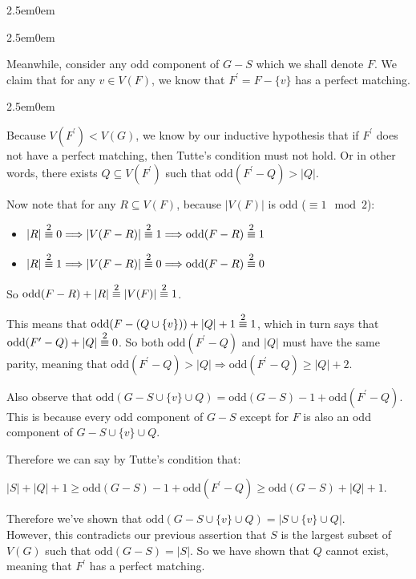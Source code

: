 \documentclass{book}
\newcommand{\hFour}{%
   \color{Cerulean}
   \fontsize{12}{14}\selectfont%
}
\newenvironment{myIndent}{%
   \begin{adjustwidth}{2.5em}{0em}%
}{%
   \end{adjustwidth}%
}
\newcommand{\oddComp}[1]{\mathrm{odd}(#1)}
\newcommand{\myequiv}[1]{\stackrel{\mathclap{\mbox{\footnotesize{$#1$}}}}{\equiv}}
\newcommand{\retTwo}{\hfill\bigbreak}
\begin{document}
{\begin{myIndent}
\begin{myIndent}
      Meanwhile, consider any odd component of $G - S$ which we shall denote $F$. We claim that for any $v \in V(F)$, we know that $F^\prime = F - \{v\}$ has a perfect matching.
      {\begin{myIndent} \hFour
         Because $V(F^\prime) < V(G)$, we know by our inductive hypothesis that if $F^\prime$ does not have a perfect matching, then Tutte's condition must not hold. Or in other words, there exists $Q \subseteq V(F^\prime)$ such that $\oddComp{F^\prime - Q} > |Q|$. \retTwo

         Now note that for any $R \subseteq V(F)$, because $|V(F)|$ is odd ($\equiv 1 \mod{2}$):
         \begin{itemize}
            \item $|R| \myequiv{2} 0 \Longrightarrow |V(F - R)| \myequiv{2} 1 \Longrightarrow \oddComp{F - R} \myequiv{2} 1$
            \item  $|R| \myequiv{2} 1 \Longrightarrow |V(F - R)| \myequiv{2} 0 \Longrightarrow \oddComp{F - R} \myequiv{2} 0$
         \end{itemize}
         So $\oddComp{F - R} + |R| \myequiv{2} |V(F)| \myequiv{2} 1$. \retTwo

         This means that $\oddComp{F - (Q \cup \{v\})} + |Q| + 1 \myequiv{2} 1$, which in turn says that $\oddComp{F^\prime - Q} + |Q| \myequiv{2} 0$. So both $\oddComp{F^\prime - Q}$ and $|Q|$ must have the same parity, meaning that  $\oddComp{F^\prime - Q} > |Q| \Rightarrow \oddComp{F^\prime - Q} \geq |Q| + 2$. \retTwo

         Also observe that $\oddComp{G - S \cup \{v\} \cup Q} = \oddComp{G - S} - 1 + \oddComp{F^\prime - Q}$. This is because every odd component of $G - S$ except for $F$ is also an odd component of $G - S \cup \{v\} \cup Q$. \retTwo

         Therefore we can say by Tutte's condition that:

         {\center$ |S| + |Q| + 1 \geq  \oddComp{G - S} - 1 + \oddComp{F^\prime - Q} \geq \oddComp{G - S} + |Q| + 1$.\par}

         \newpage

         Therefore we've shown that $\oddComp{G - S \cup \{v\} \cup Q} = |S \cup \{v\} \cup Q|$.\\ However, this contradicts our previous assertion that $S$ is the largest subset of $V(G)$ such that $\oddComp{G - S} = |S|$. So we have shown that $Q$ cannot exist, meaning that $F^\prime$ has a perfect matching. \retTwo
      \end{myIndent}}


\end{myIndent}
\end{myIndent}}
\end{document}
